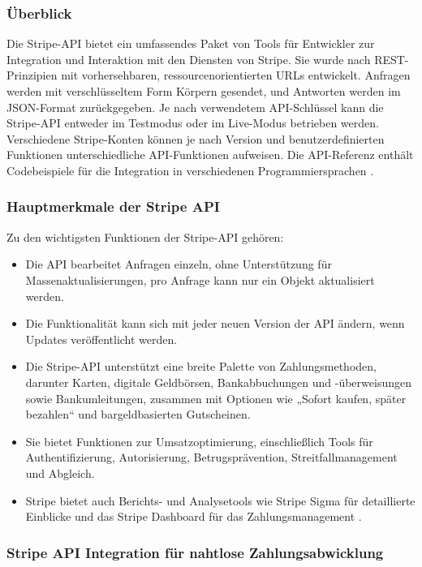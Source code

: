 \subsubsection{Überblick}

Die Stripe-API bietet ein umfassendes Paket von Tools für Entwickler zur Integration und Interaktion mit den Diensten von Stripe. Sie wurde nach REST-Prinzipien mit vorhersehbaren, ressourcenorientierten URLs entwickelt. Anfragen werden mit verschlüsseltem Form Körpern gesendet, und Antworten werden im JSON-Format zurückgegeben. Je nach verwendetem API-Schlüssel kann die Stripe-API entweder im Testmodus oder im Live-Modus betrieben werden. Verschiedene Stripe-Konten können je nach Version und benutzerdefinierten Funktionen unterschiedliche API-Funktionen aufweisen. Die API-Referenz enthält Codebeispiele für die Integration in verschiedenen Programmiersprachen \cite{Stripe-API:o.J}.

\subsubsection{Hauptmerkmale der Stripe API}
Zu den wichtigsten Funktionen der Stripe-API gehören:

\begin{itemize}
	\item Die API bearbeitet Anfragen einzeln, ohne Unterstützung für Massenaktualisierungen, pro Anfrage kann nur ein Objekt aktualisiert werden.
	\item Die Funktionalität kann sich mit jeder neuen Version der API ändern, wenn Updates veröffentlicht werden.
	\item Die Stripe-API unterstützt eine breite Palette von Zahlungsmethoden, darunter Karten, digitale Geldbörsen, Bankabbuchungen und -überweisungen sowie Bankumleitungen, zusammen mit Optionen wie „Sofort kaufen, später bezahlen“ und bargeldbasierten Gutscheinen.
	\item Sie bietet Funktionen zur Umsatzoptimierung, einschließlich Tools für Authentifizierung, Autorisierung, Betrugsprävention, Streitfallmanagement und Abgleich.
	\item Stripe bietet auch Berichts- und Analysetools wie Stripe Sigma für detaillierte Einblicke und das Stripe Dashboard für das Zahlungsmanagement \cite{Stripe-API:o.J}.
\end{itemize}

\subsubsection{Stripe API Integration für nahtlose Zahlungsabwicklung}

